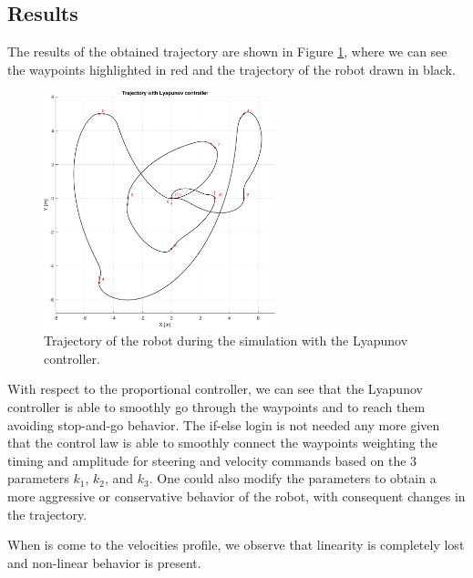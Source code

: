 \subsection{Results}
\label{subsec:lyapunov_results}

The results of the obtained trajectory are shown in Figure \ref{fig:lyapunov_controller_trajectory}, where we can see the waypoints highlighted in red and the trajectory of the robot drawn in black.

\begin{figure}[H]
    \centering
    \includegraphics[width=0.6\textwidth]{./img/MATLAB/trajectory_lyapunov.pdf}
    \caption{Trajectory of the robot during the simulation with the Lyapunov controller.}
    \label{fig:lyapunov_controller_trajectory}
\end{figure}

With respect to the proportional controller, we can see that the Lyapunov controller is able to smoothly go through the waypoints and to reach them avoiding stop-and-go behavior.
The if-else login is not needed any more given that the control law is able to smoothly connect the waypoints weighting the timing and amplitude for steering and velocity commands based on the 3 parameters $k_1$, $k_2$, and $k_3$.
One could also modify the parameters to obtain a more aggressive or conservative behavior of the robot, with consequent changes in the trajectory.

When is come to the velocities profile, we observe that linearity is completely lost and non-linear behavior is present.

